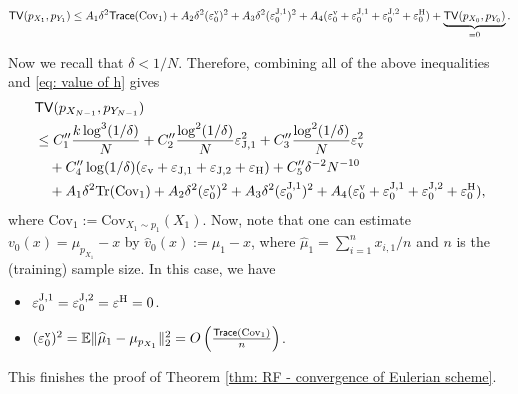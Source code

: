\documentclass{article}
\theoremstyle{plain}
\theoremstyle{definition}
\theoremstyle{remark}
\def\bbE{\mathbb{E}}
\def\Norm#1{\Vert#1\Vert}
\def\tr{{\sf tr}}
\def\TV{{\sf TV}}
\def\Cov{\text{Cov}}
\def\evel{\varepsilon^{\rm v}}
\def\meanevel{\varepsilon_{\rm v}}
\def\evelJone{\varepsilon^{\rm J,1}}
\def\meanevelJone{\varepsilon_{\rm J,1}}
\def\evelJtwo{\varepsilon^{\rm J,2}}
\def\meanevelJtwo{\varepsilon_{\rm J,2}}
\def\evelH{\varepsilon^{\rm H}}
\def\meanevelH{\varepsilon_{\rm H}}
\def\tr{{\sf Trace}}
\DeclareMathOperator{\Tr}{Tr}
\begin{document}
\begin{align*}
    \TV(p_{X_1}, p_{Y_1}) \le A_1 \delta^2 \tr(\Cov_1) + A_2 \delta^2 (\evel_0)^2 + A_3 \delta^2 (\evelJone_0)^2 + A_4 (\evel_0 + \evelJone_0 + \evelJtwo_0 + \evelH_0) + \underbrace{\TV(p_{X_0},p_{ Y_0})}_{=0}.
\end{align*}

Now we recall that $\delta < 1/N$.
Therefore, combining all of the above inequalities and \eqref{eq: value of h} gives 
\begin{align*}
    & \TV(p_{X_{N-1}}, p_{Y_{N-1}})\\
    & \le C_1''  \frac{k \log^3 (1/\delta)  }{N} + C_2''  \frac{\log^2 (1/\delta)}{N}   \meanevelJone^2 + C_3'' \frac{\log^2 (1/\delta)}{N} \meanevel^2 \\
    & \quad + C_4'' \log (1/\delta) (\meanevel + \meanevelJone + \meanevelJtwo + \meanevelH) + C_5'' \delta^{-2} N^{-10}\\
     &\quad +   A_1 \delta^2 {\Tr(\Cov_1)} + A_2 \delta^2 (\evel_0)^2 + A_3 \delta^2 (\evelJone_0)^2 + A_4 (\evel_0 + \evelJone_0 + \evelJtwo_0 + \evelH_0) , 
\end{align*}
where $\Cov_1:= \Cov_{X_1 \sim p_1}(X_1)$.
Now, note that one can estimate $v_0(x) = \mu_{p_{X_1}} - x$ by $\widehat v_0(x):= \widehat \mu_1 - x$, where $\widehat \mu_1 = \sum_{i=1}^n x_{i,1}/n$ and $n$ is the (training) sample size. In this case, we have 
\begin{itemize}
    \item $\evelJone_0 = \evelJtwo_0 = \evelH = 0$.
    \item $(\evel_0)^2 = \bbE \Norm{\widehat \mu_1 - \mu_{p_{X_1}}}_2^2 = O\left( \frac{\tr(\Cov_1)}{n }\right)$.
\end{itemize}
This finishes the proof of Theorem \ref{thm: RF - convergence of Eulerian scheme}.



\end{document}
